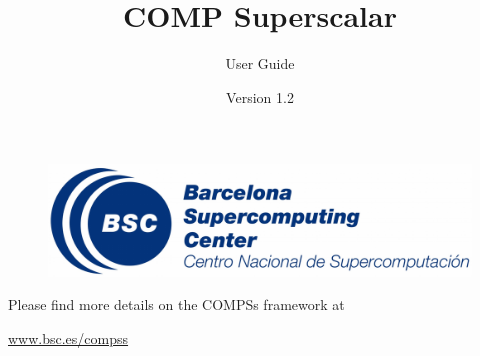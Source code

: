 \documentclass[a4paper,12pt]{article}
\title{\Huge{\bf COMP Superscalar}}
\author{\huge{User Guide}}
\date{\huge{Version 1.2}}
\begin{document}
  
  \hypersetup{pageanchor=false}
  \begin{titlepage}
    \maketitle
     \begin{figure}[b!]
      \centering
      \includegraphics[width=120mm]{./Figures/bsc_280.jpg}
     \end{figure}
    \thispagestyle{empty}
  \end{titlepage}
  \hypersetup{pageanchor=true}
  
  
  \setcounter{tocdepth}{6}
  \tableofcontents
  \listoffigures
  \listoftables
    
  \newpage
  
  
    
  
           
  
          
  
           
  
           
  
           
  
           
  
  

  \newpage

  \vspace*{\fill} 
  \begin{center}
  Please find more details on the COMPSs framework at

  \Huge{\url{www.bsc.es/compss}}
  \end{center}    
  \vspace*{\fill} 
           
        
\end{document}
